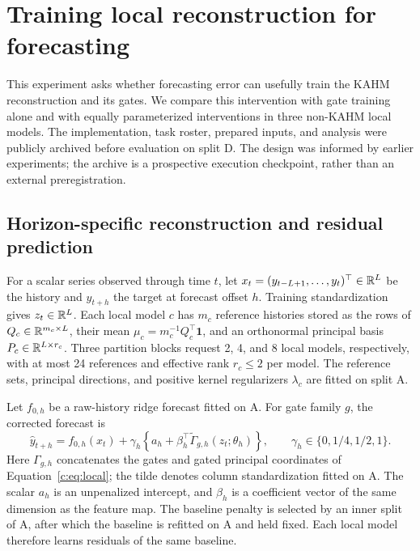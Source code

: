 \section{Training local reconstruction for forecasting}
\label{sec:direct-reconstruction}

This experiment asks whether forecasting error can usefully train
the KAHM reconstruction and its gates. We compare this intervention with
gate training alone and with equally parameterized interventions in three
non-KAHM local models. The implementation, task roster, prepared inputs,
and analysis were publicly archived before evaluation on split D. The
design was informed by earlier experiments; the archive is a prospective
execution checkpoint, rather than an external preregistration.

\subsection{Horizon-specific reconstruction and residual prediction}

For a scalar series observed through time $t$, let
$x_t=(y_{t-L+1},\ldots,y_t)^\top\in\mathbb{R}^L$ be the history and
$y_{t+h}$ the target at forecast offset $h$. Training standardization gives
$z_t\in\mathbb{R}^L$. Each local model $c$ has $m_c$ reference histories stored as
the rows of $Q_c\in\mathbb{R}^{m_c\times L}$, their mean
$\mu_c=m_c^{-1}Q_c^\top\mathbf1$, and an orthonormal principal basis
$P_c\in\mathbb{R}^{L\times r_c}$. Three partition blocks request 2, 4, and 8
local models, respectively, with at most 24 references and effective
rank $r_c\leq2$ per model. The reference sets, principal directions,
and positive kernel regularizers $\lambda_c$ are fitted on split A.

Let $f_{0,h}$ be a raw-history ridge forecast fitted on A. For gate family
$g$, the corrected forecast is
\begin{equation}
 \widehat y_{t+h}=f_{0,h}(x_t)+\gamma_h
 \left\{a_h+\beta_h^\top
       \widetilde\Gamma_{g,h}(z_t;\theta_h)\right\},
 \qquad \gamma_h\in\{0,1/4,1/2,1\}.
 \label{eq:direct-forecast}
\end{equation}
Here $\Gamma_{g,h}$ concatenates the gates and gated principal coordinates
of Equation~\eqref{c:eq:local}; the tilde denotes column standardization
fitted on A. The scalar $a_h$ is an unpenalized intercept, and $\beta_h$
is a coefficient vector of the same dimension as the feature map.
The baseline penalty is selected by an inner split of A, after which
the baseline is refitted on A and held fixed. Each local model therefore
learns residuals of the same baseline.

